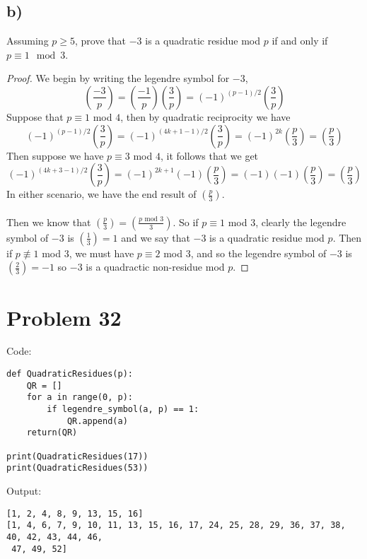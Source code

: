\documentclass{article}
\theoremstyle{definition}
\begin{document}
\subsection*{b)}
\begin{mdframed}
    Assuming $p \geqslant 5$, prove that $-3$ is a quadratic residue mod $p$ if and only if $p \equiv 1 \mod{3}$.
\end{mdframed}
\begin{proof}
    We begin by writing the legendre symbol for $-3$,
    \[
        \left(\frac{-3}{p}\right) = \left(\frac{-1}{p}\right)\left(\frac{3}{p}\right) = (-1)^{(p-1)/2}\left(\frac{3}{p}\right)
    \]
    Suppose that $p \equiv 1$ mod ${4}$,
    then by quadratic reciprocity we have 
    \[
        (-1)^{(p-1)/2}\left(\frac{3}{p}\right) = (-1)^{(4k + 1 - 1)/2}\left(\frac{3}{p}\right) = (-1)^{2k}\left(\frac{p}{3}\right) = \left(\frac{p}{3}\right)
    \]
    Then suppose we have $p \equiv 3$ mod $4$, it follows that we get
    \[
        (-1)^{(4k + 3 - 1)/2} \left(\frac{3}{p}\right)  = (-1)^{2k + 1}(-1)\left(\frac{p}{3}\right) = (-1)(-1)\left(\frac{p}{3}\right) = \left(\frac{p}{3}\right)
    \]
    In either scenario, we have the end result of $\left(\frac{p}{3}\right)$. \\\\
    Then we know that $\left(\frac{p}{3}\right) = \left(\frac{p \text{ mod } 3}{3}\right)$.
    So if $p \equiv 1$ mod $3$, clearly the legendre symbol of $-3$ is $\left(\frac{1}{3}\right) = 1$ and we say that $-3$ is a quadratic residue mod $p$.
    Then if $p \not\equiv 1$ mod $3$, we must have $p \equiv 2$ mod $3$, and so the legendre symbol of $-3$ is $\left(\frac{2}{3}\right) = -1$ so $-3$ is a quadractic non-residue mod $p$.
\end{proof}
\section*{Problem 32}
\begin{mdframed}
    Code:
    \begin{verbatim}
def QuadraticResidues(p):
    QR = []
    for a in range(0, p):
        if legendre_symbol(a, p) == 1:
            QR.append(a)
    return(QR)

print(QuadraticResidues(17))
print(QuadraticResidues(53))
    \end{verbatim}
    Output:
    \begin{verbatim}
[1, 2, 4, 8, 9, 13, 15, 16]
[1, 4, 6, 7, 9, 10, 11, 13, 15, 16, 17, 24, 25, 28, 29, 36, 37, 38, 40, 42, 43, 44, 46,
 47, 49, 52]        
    \end{verbatim}
\end{mdframed}
\end{document}
